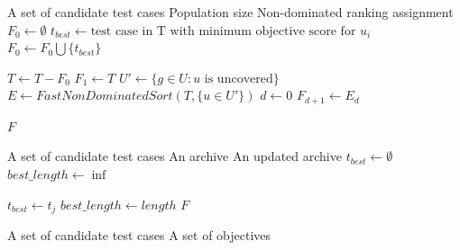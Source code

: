 \documentclass{article}
\newcommand{\Desc}[2]{\State \makebox[2em][l]{#1}#2}
\begin{document}
\begin{algorithm}[t]
\caption{$PreferenceSorting(T, M)$~\cite{Panichella2018}}\label{alg:preference-sorting}
\begin{algorithmic}
\Input
  \Desc{$T$}{A set of candidate test cases}
  \Desc{$M$}{Population size}
  \EndInput
  \Output
  \Desc{$F$}{Non-dominated ranking assignment}
  \EndOutput
\State $F_0 \gets \emptyset$
\State $t_{best} \gets \textrm{test case in T with minimum objective score for } u_i$
\State $F_0 \gets F_0 \bigcup \{t_{best}\}$
\EndFor

\State $T \gets T - F_0$
\State $F_1 \gets T$
\Else
\State $U' \gets \{g \in U : u \textrm{ is uncovered}\}$
\State $E \gets FastNonDominatedSort(T, \{u \in U'\})$
\State $d \gets 0$
\State $F_{d + 1} \gets E_d$
\EndFor
\EndIf

\State \Return $F$
\end{algorithmic}
\end{algorithm}

\begin{algorithm}[t]
\caption{$UpdateArchive(T, A)$~\cite{Panichella2018}}\label{alg:update-archive}
\begin{algorithmic}
\Input
  \Desc{$T$}{A set of candidate test cases}
  \Desc{$A$}{An archive}
  \EndInput
  \Output
  \Desc{$A$}{An updated archive}
  \EndOutput
{}
\State $t_{best} \gets \emptyset$
\State $best\_length \gets \inf$
\EndIf

\State $t_{best} \gets t_j$
\State $best\_length \gets length$
\EndIf
\EndFor
\EndFor
\State \Return $F$
\end{algorithmic}
\end{algorithm}

\begin{algorithm}[t]
\caption{$CrowdingDistanceAssignment(T, M)$~\cite{Deb_2000}}\label{alg:crowding-distance-assignment}
\begin{algorithmic}
\Input
  \Desc{$T$}{A set of candidate test cases}
  \Desc{$M$}{A set of objectives}
\EndInput
{}


\EndFor

  \EndFor
\EndFor
\end{algorithmic}
\end{algorithm}
\end{document}
